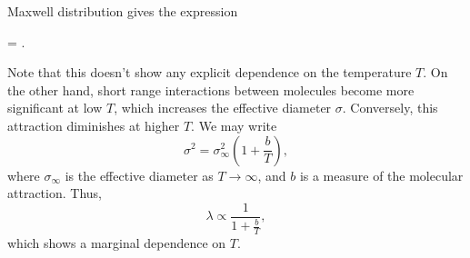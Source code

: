 \documentclass[11pt]{article}
\theoremstyle{definition}
\newenvironment{boxedeq*}%
    {\begin{equationbox}\begin{equation*}}%
    {\end{equation*}\end{equationbox}}
\theoremstyle{remark}
\numberwithin{equation}{section}
\begin{document}
    Maxwell distribution gives the expression
    \begin{boxedeq*}
        \lambda = .
    \end{boxedeq*}
    Note that this doesn't show any explicit dependence on the temperature $T$.
    On the other hand, short range interactions between molecules become more
    significant at low $T$, which increases the effective diameter $\sigma$.
    Conversely, this attraction diminishes at higher $T$. We may write \[
        \sigma^2 = \sigma_\infty^2 \left(1 + \frac{b}{T}\right),
    \] where $\sigma_\infty$ is the effective diameter as $T \to \infty$, and $b$ is
    a measure of the molecular attraction. Thus, \[
        \lambda \propto \frac{1}{1 + \frac{b}{T}},
    \] which shows a marginal dependence on $T$.
\end{document}
